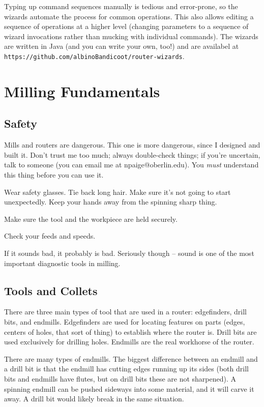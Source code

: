 \documentclass[a4paper,11pt]{article}
\begin{document}
Typing up command sequences manually is tedious and error-prone, so the wizards automate the process for common operations. This also allows editing a sequence of operations at a higher level (changing parameters to a sequence of wizard invocations rather than mucking with individual commands). The wizards are written in Java (and you can write your own, too!) and are availabel at \texttt{https://github.com/albinoBandicoot/router-wizards}.

\section{Milling Fundamentals}

\subsection{Safety}
Mills and routers are dangerous. This one is more dangerous, since I designed and built it. Don't trust me too much; always double-check things; if you're uncertain, talk to someone (you can email me at npaige@oberlin.edu). You \textit{must} understand this thing before you can use it.

Wear safety glasses. Tie back long hair. Make sure it's not going to start unexpectedly. Keep your hands away from the spinning sharp thing.

Make sure the tool and the workpiece are held securely. 

Check your feeds and speeds.

If it sounds bad, it probably is bad. Seriously though -- sound is one of the most important diagnostic tools in milling.

\subsection{Tools and Collets}
There are three main types of tool that are used in a router: edgefinders, drill bits, and endmills. Edgefinders are used for locating features on parts (edges, centers of holes, that sort of thing) to establish where the router is. Drill bits are used exclusively for drilling holes. Endmills are the real workhorse of the router.


There are many types of endmills. The biggest difference between an endmill and a drill bit is that the endmill has cutting edges running up its sides (both drill bits and endmills have flutes, but on drill bits these are not sharpened). A spinning endmill can be pushed sideways into some material, and it will carve it away. A drill bit would likely break in the same situation.
\end{document}
